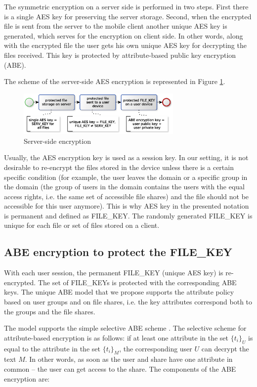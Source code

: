 \documentclass[twocolumn]{svjour3}          	%
\begin{document}
The symmetric encryption on a server side is performed in two steps. First there is a single AES key for preserving the server storage. Second, when the encrypted file is sent from the server to the mobile client another unique AES key is generated, which serves for the encryption on client side. In other words, along with the encrypted file the user gets his own unique AES key for decrypting the files received. This key is protected by attribute-based public key encryption (ABE). 

The scheme of the server-side AES encryption is represented in Figure \ref{fig:09}.

\begin{figure}[h!]
	\centering
	\includegraphics[width=8cm]{fig09.eps}
	\caption{Server-side encryption}
	\label{fig:09}
\end{figure}

Usually, the AES encryption key is used as a session key. In our setting, it is not desirable to re-encrypt the files stored in the device unless there is a certain specific condition (for example, the user leaves the domain or a specific group in the domain (the group of users in the domain contains the users with the equal access rights, i.e. the same set of accessible file shares) and the file should not be accessible for this user anymore). This is why AES key in the presented notation is permanent and defined as FILE\_KEY. The randomly generated FILE\_KEY is unique for each file or set of files stored on a client. 

\subsection{ABE encryption to protect the FILE\_KEY }
\label{sec_abe}
With each user session, the permanent FILE\_KEY (uni\-que AES key) is re-encrypted. The set of FILE\_KEYs is protected with the corresponding ABE keys. The unique ABE model that we propose supports the attribute policy based on user groups and on file shares, i.e. the key attributes correspond both to the groups and the file shares. 

The model supports the simple selective ABE scheme \cite{galibus2015cloud,galibus2014}. The selective scheme for attribute-based encryption is as follows: if at least one attribute in the set $\{t_i\}_U$ is equal to the attribute in the set $\{t_i\}_M$, the corresponding user $U$ can decrypt the text $M$. In other words, as soon as the user and share have one attribute in common – the user can get access to the share. The components of the ABE encryption are:
\end{document}
